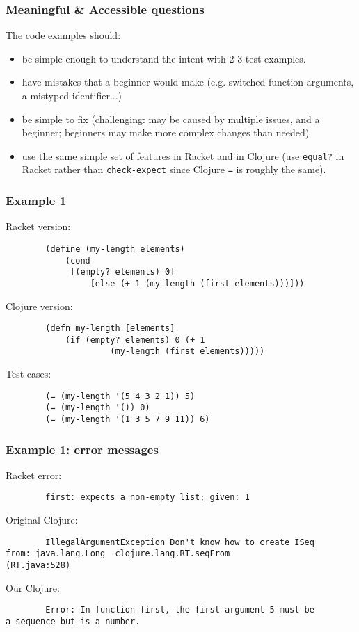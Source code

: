 \documentclass{beamer}
\begin{document}
\begin{frame}
	\frametitle{Meaningful \& Accessible questions}
The code examples should: 
	\begin{itemize}
		\item be simple enough to understand the intent with 2-3 test examples. 
		\item have mistakes that a beginner would make (e.g. switched function arguments, a mistyped identifier...) 
		\item be simple to fix (challenging: may  be caused by multiple issues, and a beginner; beginners may make more complex changes than needed)
		\item use the same simple set of features in Racket and in Clojure (use \texttt{equal?} in Racket rather than \texttt{check-expect} since Clojure {\tt =} is roughly the same). 
	\end{itemize}
\end{frame}

\begin{frame}[fragile]
\frametitle{Example 1}
Racket version:
\begin{verbatim}
		(define (my-length elements)
  			(cond
 			 [(empty? elements) 0]
			 	 [else (+ 1 (my-length (first elements)))]))
\end{verbatim}
Clojure version:  
\begin{verbatim}
		(defn my-length [elements]
 			(if (empty? elements) 0 (+ 1 
                     (my-length (first elements)))))
\end{verbatim}
Test cases:
\begin{verbatim}
		(= (my-length '(5 4 3 2 1)) 5)
		(= (my-length '()) 0)
		(= (my-length '(1 3 5 7 9 11)) 6)
\end{verbatim}
\end{frame}


\begin{frame}[fragile]
\frametitle{Example 1: error messages}
Racket error:
\begin{verbatim}
		first: expects a non-empty list; given: 1	
\end{verbatim}

Original Clojure:
\begin{verbatim}
		IllegalArgumentException Don't know how to create ISeq  
from: java.lang.Long  clojure.lang.RT.seqFrom 
(RT.java:528)
\end{verbatim}

Our Clojure: 
\begin{verbatim}
		Error: In function first, the first argument 5 must be 
a sequence but is a number.
\end{verbatim}
\end{frame}
\end{document}
